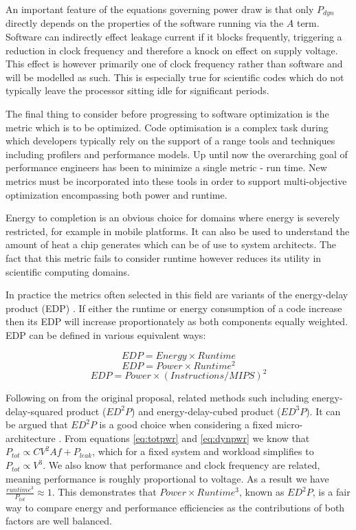 An important feature of the equations governing power draw is that only $P_{dyn}$ directly depends on the properties of the software running via the $A$ term. Software can indirectly effect leakage current if it blocks frequently, triggering a reduction in clock frequency and therefore a knock on effect on supply voltage. This effect is however primarily one of clock frequency rather than software and will be modelled as such. This is especially true for scientific codes which do not typically leave the processor sitting idle for significant periods.

The final thing to consider before progressing to software optimization is the metric which is to be optimized. Code optimisation is a complex task during which developers typically rely on the support of a range tools and techniques including profilers and performance models. Up until now the overarching goal of performance engineers has been to minimize a single metric - run time. New metrics must be incorporated into these tools in order to support multi-objective optimization encompassing both power and runtime.

Energy to completion is an obvious choice for domains where energy is severely restricted, for example in mobile platforms. It can also be used to understand the amount of heat a chip generates which can be of use to system architects. The fact that this metric fails to consider runtime however reduces its utility in scientific computing domains.

In practice the metrics often selected in this field are variants of the energy-delay product (EDP) \cite{gonzales:1995aa}. If either the runtime or energy consumption of a code increase then its EDP will increase proportionately as both components equally weighted. EDP can be defined in various equivalent ways:

\begin{equation}
EDP = Energy \times Runtime
\end{equation}
\begin{equation}
EDP = Power \times Runtime^{2}
\end{equation}
\begin{equation}
EDP = Power \times (Instructions / MIPS)^{2}
\end{equation}


Following on from the original proposal, related methods such including energy-delay-squared product ($ED^{2}P$) and energy-delay-cubed product ($ED^{3}P$). It can be argued that $ED^{2}P$ is a good choice when considering a fixed micro-architecture \cite{brooks:2000aa}. From equations \ref{eq:totpwr} and \ref{eq:dynpwr} we know that $P_{tot} \propto CV^{2}Af + P_{leak} $, which for a fixed system and workload simplifies to $P_{tot} \propto V^{3}$. We also know that performance and clock frequency are related, meaning performance is roughly proportional to voltage. As a result we have $\frac{runtime^{3}}{P_{tot}} \approx 1$. This demonstrates that $Power \times Runtime^{3}$, known as $ED^{2}P$, is a fair way to compare energy and performance efficiencies as the contributions of both factors are well balanced.